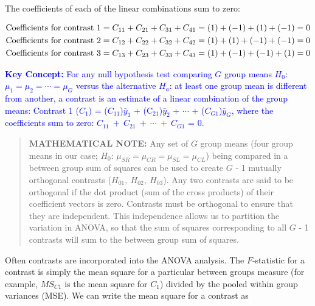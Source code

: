 \documentclass[
]{report}
\begin{document}
The coefficients of each of the linear combinations sum to zero:

\begin{align}
\text{Coefficients for contrast 1} &= C_{11} + C_{21} + C_{31} + C_{41} = (1) + (-1) + (1) + (-1) = 0 \notag \\
\text{Coefficients for contrast 2} &= C_{12} + C_{22} + C_{32} + C_{42} = (1) + (1) + (-1) + (-1) = 0 \notag \\
\text{Coefficients for contrast 3} &= C_{13} + C_{23} + C_{33} + C_{43} = (1) + (-1) + (-1) + (1) = 0
\notag
\end{align}

\textbf{\textcolor{blue}{Key Concept:}} \textcolor{blue}{For any null hypothesis test comparing $\scriptstyle G$ group means $\scriptstyle H_0$: $\mu_1 = \mu_2 = \cdots = \mu_G$ versus the alternative $\scriptstyle H_a$: at least one group mean is different from another, a contrast is an estimate of a linear combination of the group means: Contrast 1 ($\scriptstyle C_1$) = ($\scriptstyle C_{11}$)$\bar{y}_1$ + (C$\scriptstyle _{21}$)$\scriptstyle \bar{y}_2$ + $\cdots$ + ($\scriptstyle C_{G1}$)$\scriptstyle \bar{y}_G$, where the coefficients sum to zero: $\scriptstyle C_{11} \ +\  C_{21} \ +\  \cdots \ +\  C_{G1}$ = 0.}

\begin{quote}
\textbf{MATHEMATICAL NOTE:} Any set of \(\scriptstyle G\) group means (four group means in our case; \(\scriptstyle H_0\): \(\mu_{SR} = \mu_{CR} = \mu_{SL} = \mu_{CL}\)) being compared in a between group sum of squares can be used to create \(\scriptstyle G\) - 1 mutually orthogonal contrasts (\(\scriptstyle H_{01},\  H_{02},\  H_{03}\)). Any two contrasts are said to be orthogonal if the dot product (sum of the cross products) of their coefficient vectors is zero. Contrasts must be orthogonal to ensure that they are independent. This independence allows us to partition the variation in ANOVA, so that the sum of squares corresponding to all \(\scriptstyle G\) - 1 contrasts will sum to the between group sum of squares.
\end{quote}

Often contrasts are incorporated into the ANOVA analysis. The \(\scriptstyle F\)-statistic for a contrast is simply the mean square for a particular between groups measure (for example, \(\scriptstyle MS_{C1}\) is the mean square for \(\scriptstyle C_1\)) divided by the pooled within group variances (MSE). We can write the mean square for a contrast as
\end{document}
